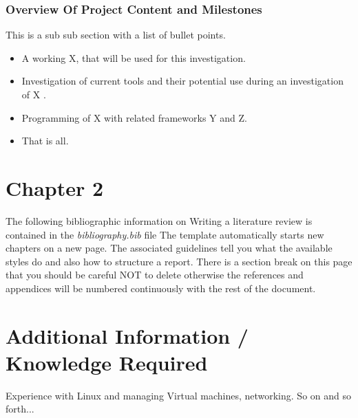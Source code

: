 \documentclass[12pt,a4paper]{article}
\begin{document}
\subsubsection{Overview Of Project Content and Milestones}

This is a sub sub section with a list of bullet points.
\begin{itemize}\itemsep0pt
	\item A working X, that will be used for this investigation.
	\item Investigation of current tools and their potential use during an investigation of X .
	\item Programming of X with related frameworks Y and Z.
	\item That is all.
\end{itemize}


\section{Chapter 2}
The following bibliographic information on Writing a literature review is contained in the \emph{bibliography.bib} file 
The template automatically starts new chapters on a new page.  The associated guidelines tell you what the available styles do and also how to structure a report.
There is a section break on this page that you should be careful NOT to delete otherwise the references and appendices will be numbered continuously with the rest of the document.

\section{Additional Information / Knowledge Required}
Experience with Linux and managing Virtual machines, networking.
So on and so forth...




\end{document}
